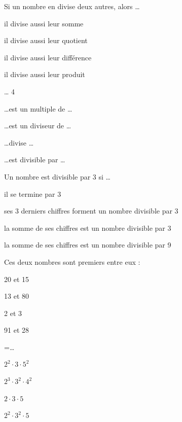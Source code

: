 \documentclass[../math2.tex]{subfiles}
\begin{document}
\begin{tasks}
    \task Si un nombre en divise deux autres, alors \dots
    \begin{enumerate}[cols=2, label={\faIcon[regular]{square}}]
        \item il divise aussi leur somme
        \item il divise aussi leur quotient
        \item il divise aussi leur différence
        \item il divise aussi leur produit
    \end{enumerate}

     \dots{} 4
    \begin{enumerate}[cols=2, label={\faIcon[regular]{square}}]
        \item \dots est un multiple de \dots
        \item \dots est un diviseur de \dots
        \item \dots divise \dots
        \item \dots est divisible par \dots
    \end{enumerate}

    \task Un nombre est divisible par 3 si \dots
    \begin{enumerate}[label={\faIcon[regular]{square}}]
        \item il se termine par 3
        \item ses 3 derniers chiffres forment un nombre divisible par 3
        \item la somme de ses chiffres est un nombre divisible par 3
        \item la somme de ses chiffres est un nombre divisible par 9
    \end{enumerate}

    \task Ces deux nombres sont premiers entre eux :
    \begin{enumerate}[cols=4, label={\faIcon[regular]{square}}]
        \item 20 et 15
        \item 13 et 80
        \item 2 et 3
        \item 91 et 28
    \end{enumerate}

     =\dots
    \begin{enumerate}[cols=4, label={\faIcon[regular]{square}}]
        \item $2^2\cdot 3\cdot 5^2$
        \item $2^3\cdot 3^2 \cdot 4^2$
        \item $2\cdot 3\cdot 5$
        \item $2^2 \cdot 3^2 \cdot 5$
    \end{enumerate}


\end{tasks}
\end{document}
